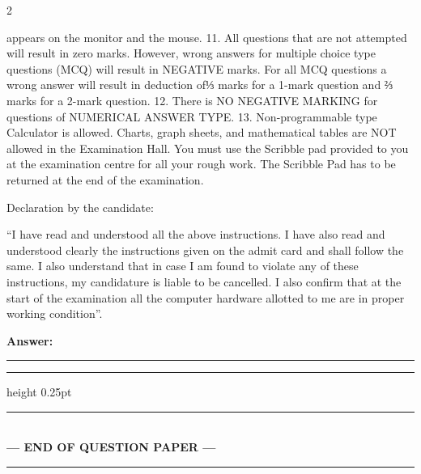 \documentclass[a4paper,10pt,twoside]{article}
\begin{document}
\begin{multicols}{2}
{appears on the monitor and the mouse.
11. All questions that are not attempted will result in zero marks. However, wrong answers for multiple
choice type questions (MCQ) will result in NEGATIVE marks. For all MCQ questions a wrong
answer will result in deduction of⅓ marks for a 1-mark question and ⅔ marks for a 2-mark question.
12. There is NO NEGATIVE MARKING for questions of NUMERICAL ANSWER TYPE.
13. Non-programmable type Calculator is allowed. Charts, graph sheets, and mathematical tables are NOT
allowed in the Examination Hall. You must use the Scribble pad provided to you at the examination
centre for all your rough work. The Scribble Pad has to be returned at the end of the examination.
\par\smallskip
Declaration by the candidate:
\par\smallskip
``I have read and understood all the above instructions. I have also read and understood clearly the
instructions given on the admit card and shall follow the same. I also understand that in case I am found to
violate any of these instructions, my candidature is liable to be cancelled. I also confirm that at the start of
the examination all the computer hardware allotted to me are in proper working condition''. \par}
\par\vspace{3pt}\noindent\textbf{Answer:} \rule{3.2cm}{0.4pt}
\par\vspace{6pt}\hrule height 0.25pt\vspace{6pt}
\end{multicols}
\vspace{8pt}
\begin{center}
\rule{0.35\linewidth}{0.5pt}\\[2pt]
\textbf{\small --- END OF QUESTION PAPER ---}\\[-8pt]
\rule{0.35\linewidth}{0.5pt}
\end{center}
\vspace{10pt}
\end{document}
